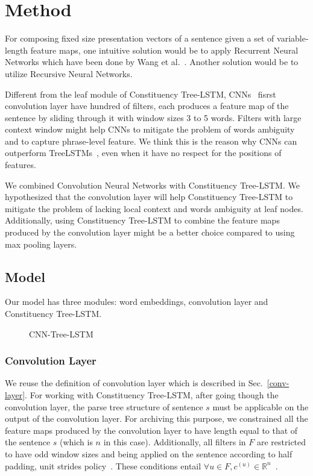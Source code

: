 \section{Method}
For composing fixed size presentation vectors of a sentence given a set of variable-length feature maps, one intuitive solution would be to apply Recurrent Neural Networks which have been done by Wang et al.~\cite{cnn-rnn}.
Another solution would be to utilize Recursive Neural Networks.

Different from the leaf module of Constituency Tree-LSTM, CNNs~\cite{KimCNN,DCNN,2-layer-cnn} fisrst convolution layer have hundred of filters, each produces a feature map of the sentence by sliding through it with window sizes 3 to 5 words.
Filters with large context window might help CNNs to mitigate the problem of words ambiguity and to capture phrase-level feature.
We think this is the reason why CNNs can outperform TreeLSTMs~\cite{KimCNN}, even when it have no respect for the positions of features. 

We combined Convolution Neural Networks with Constituency Tree-LSTM.
We hypothesized that the convolution layer will help Constituency Tree-LSTM to mitigate the problem of lacking local context and words ambiguity at leaf nodes.
Additionally, using Constituency Tree-LSTM to combine the feature maps produced by the convolution layer might be a better choice compared to using max pooling layers.
\subsection{Model}
Our model has three modules: word embeddings, convolution layer and Constituency Tree-LSTM.
\begin{figure} [H]
	\centering
	
	\caption[qwerty]{CNN-Tree-LSTM}
\end{figure}
\subsubsection{Convolution Layer}
We reuse the definition of convolution layer which is described in Sec.~\ref{conv-layer}.
For working with Constituency Tree-LSTM, after going though the convolution layer, the parse tree structure of sentence \(s\) must be applicable on the output of the convolution layer. 
For archiving this purpose, we constrained all the feature maps produced by the convolution layer to have length equal to that of the sentence \(s\) (which is \(n\) in this case).
Additionally, all filters in \(F\) are restricted to have odd window sizes and being applied on the sentence according to half padding, unit strides policy~\cite{conv-arith}.
These conditions entail \({\forall u \in F,  c^{(u)} \in \mathbb{R}^n}\)~\cite{conv-arith}.

